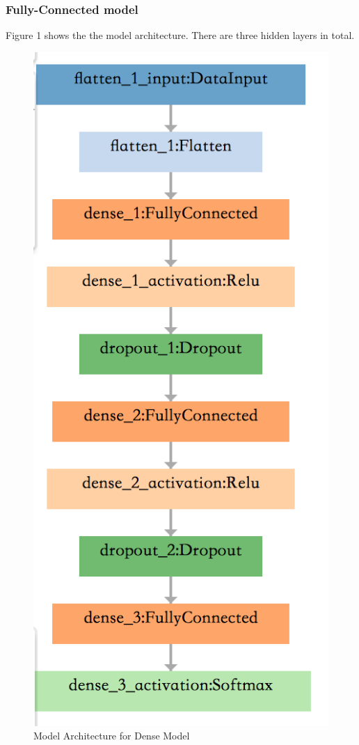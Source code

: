 \documentclass{article}
\begin{document}
\subsubsection*{Fully-Connected model}
Figure 1 shows the the model architecture. There are three hidden layers in total. 

\begin{figure}[htbp]
    \centering
    \includegraphics[scale = 0.6]{fig1.png}
    \caption{Model Architecture for Dense Model}
    \label{fig1}
\end{figure}
\end{document}
